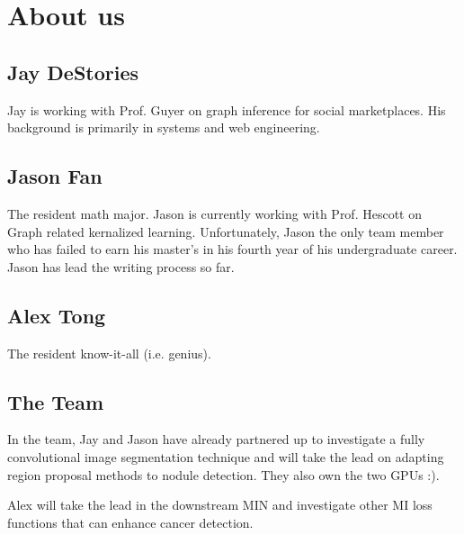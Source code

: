 \documentclass[twocolumn,10pt]{article}
\begin{document}
\section{About us}
\subsection{Jay DeStories}
Jay is working with Prof. Guyer on graph inference for social
marketplaces. His background is primarily in systems and web engineering.

\subsection{Jason Fan}
The resident math major. Jason is currently working with Prof. Hescott on Graph
related kernalized learning. Unfortunately, Jason the only team member 
who has failed to earn his master's in his fourth year of his undergraduate career.
Jason has lead the writing process so far.

\subsection{Alex Tong}
The resident know-it-all (i.e. genius).

\subsection{The Team}
In the team, Jay and Jason have already partnered up to investigate a
fully convolutional image segmentation technique and will take the lead on
adapting region proposal methods to nodule detection. They also own the
two GPUs :).

Alex will take the lead in the downstream MIN and investigate other MI loss 
functions that can enhance cancer detection.


\end{document}
